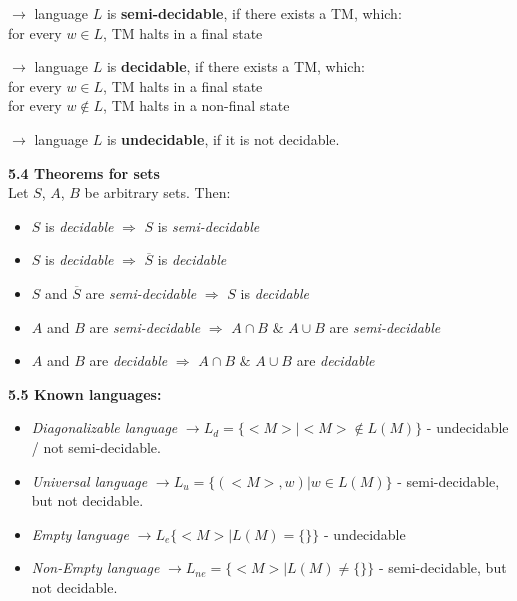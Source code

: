 \documentclass{article}
\begin{document}
\begin{multicols}{2}
$\rightarrow$ language $L$ is \textbf{semi-decidable}, if there exists a TM, which:\\
    for every $w \in L$, TM halts in a final state

$\rightarrow$ language $L$ is \textbf{decidable}, if there exists a TM, which:\\
    for every $w \in L$, TM halts in a final state\\
    for every $w \notin L$, TM halts in a non-final state


$\rightarrow$ language $L$ is \textbf{undecidable}, if it is not decidable.

\textbf{5.4 Theorems for sets}\\
Let $S$, $A$, $B$ be arbitrary sets. Then:
\begin{itemize}
    \setlength\itemsep{-0.4em}
    \item $S$ is \textit{decidable} $\Rightarrow$ $S$ is \textit{semi-decidable}
    \item $S$ is \textit{decidable} $\Rightarrow$ $\overline{S}$ is \textit{decidable}
    \item $S$ and $\overline{S}$ are \textit{semi-decidable} $\Rightarrow$ $S$ is \textit{decidable}
    \item $A$ and $B$ are \textit{semi-decidable} $\Rightarrow$ $A \cap B $ $\&$ $A \cup B$ are \textit{semi-decidable}
    \item $A$ and $B$ are \textit{decidable} $\Rightarrow$ $A \cap B $ $\&$ $A \cup B$ are \textit{decidable}
\end{itemize}

\textbf{5.5 Known languages:}\\
\begin{itemize}
    \setlength\itemsep{-0.2em}
    \item \textit{Diagonalizable language} $\rightarrow L_d = \{<M >| <M> \notin L(M)\}$ - undecidable / not semi-decidable.
    \item \textit{Universal language} $\rightarrow L_u = \{(<M>, w) | w \in L(M)\}$ - semi-decidable, but not decidable.
    \item \textit{Empty language} $\rightarrow L_e \{<M> | L(M) = \{\}\}$ - undecidable
    \item \textit{Non-Empty language} $\rightarrow L_{ne} = \{<M> | L(M) \neq \{\}\}$ - semi-decidable, but not decidable.
\end{itemize}


\end{multicols}
\end{document}

